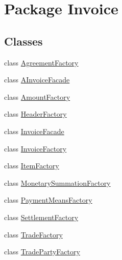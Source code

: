 \hypertarget{namespace_invoice}{}\section{Package Invoice}
\label{namespace_invoice}
\subsection*{Classes}
\begin{DoxyCompactItemize}
\item 
class \hyperlink{class_invoice_1_1_agreement_factory}{Agreement\+Factory}
\item 
class \hyperlink{class_invoice_1_1_a_invoice_facade}{A\+Invoice\+Facade}
\item 
class \hyperlink{class_invoice_1_1_amount_factory}{Amount\+Factory}
\item 
class \hyperlink{class_invoice_1_1_header_factory}{Header\+Factory}
\item 
class \hyperlink{class_invoice_1_1_invoice_facade}{Invoice\+Facade}
\item 
class \hyperlink{class_invoice_1_1_invoice_factory}{Invoice\+Factory}
\item 
class \hyperlink{class_invoice_1_1_item_factory}{Item\+Factory}
\item 
class \hyperlink{class_invoice_1_1_monetary_summation_factory}{Monetary\+Summation\+Factory}
\item 
class \hyperlink{class_invoice_1_1_payment_means_factory}{Payment\+Means\+Factory}
\item 
class \hyperlink{class_invoice_1_1_settlement_factory}{Settlement\+Factory}
\item 
class \hyperlink{class_invoice_1_1_trade_factory}{Trade\+Factory}
\item 
class \hyperlink{class_invoice_1_1_trade_party_factory}{Trade\+Party\+Factory}
\end{DoxyCompactItemize}
